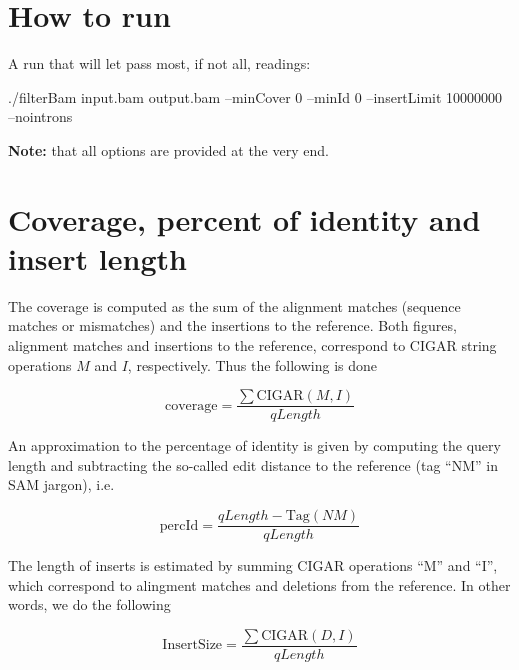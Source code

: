 \documentclass[11pt]{article}
\begin{document}
\section{How to run}
A run that will let pass most, if not all, readings: 
\begin{flushleft}
./filterBam input.bam output.bam --minCover 0 --minId 0  --insertLimit 10000000 --nointrons
\end{flushleft}
\textbf{Note:} that all options are provided at the very end.

\section{Coverage, percent of identity and insert length}
The coverage is computed as the sum of the alignment matches (sequence matches or mismatches) and 
the insertions to the reference. Both figures, alignment matches and insertions to the reference, correspond 
to CIGAR string operations $M$ and $I$, respectively. Thus the following is done 

\begin{equation}
	\mathrm{coverage} = \frac{\sum\mathrm{CIGAR}\left(M,I\right)}{qLength}
\end{equation}

An approximation to the percentage of identity is given by computing the query length and subtracting the 
so-called edit distance to the reference (tag ``NM'' in SAM jargon), i.e.

\begin{equation}
	\mathrm{percId} = \frac{qLength - \mathrm{Tag}(NM)}{qLength}
\end{equation}

The length of inserts is estimated by summing CIGAR operations ``M'' and ``I'', which correspond to alingment 
matches and deletions from the reference. In other words, we do the following

\begin{equation}
	\mathrm{InsertSize} = \frac{\sum\mathrm{CIGAR}\left(D,I\right)}{qLength}
\end{equation}




\end{document}
